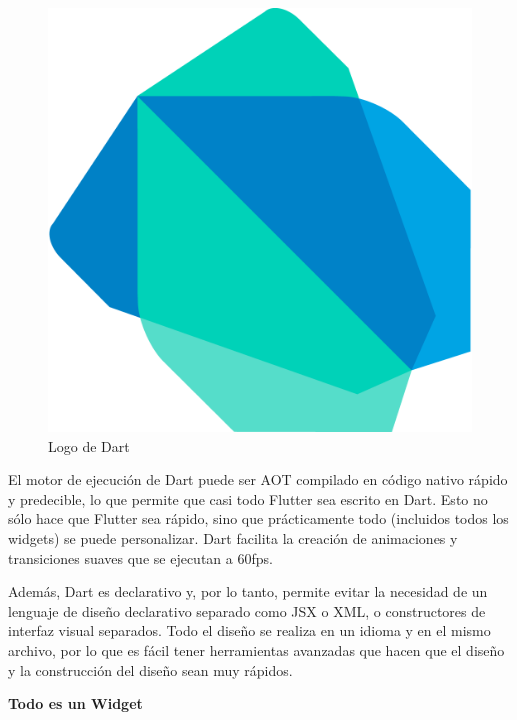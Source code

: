 \begin{figure}[!htb]
    \centering
    \includegraphics[scale=0.1]{TT/img/analisis/dartlogo.png}
    \caption{Logo de Dart}
    \label{graphic:DartLogo}    
\end{figure}

El motor de ejecución de Dart puede ser \acrfull{AOT} compilado en código nativo rápido y predecible, lo que permite que casi todo Flutter sea escrito en Dart. Esto no sólo hace que Flutter sea rápido, sino que prácticamente todo (incluidos todos los widgets) se puede personalizar. Dart facilita la creación de animaciones y transiciones suaves que se ejecutan a 60fps.

Además, Dart es declarativo y, por lo tanto, permite evitar la necesidad de un lenguaje de diseño declarativo separado como \Gls{JSX} o \Gls{XML}, o constructores de interfaz visual separados. Todo el diseño se realiza en un idioma y en el mismo archivo, por lo que es fácil tener herramientas avanzadas que hacen que el diseño y la construcción del diseño sean muy rápidos.

\textbf{Todo es un Widget}

